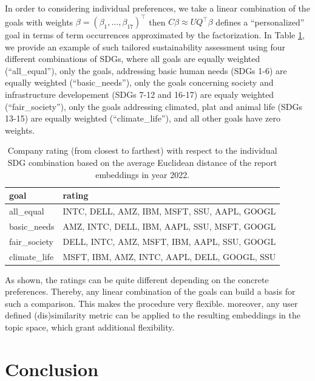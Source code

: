 \documentclass[
]{article}
\begin{document}
In order to considering individual preferences, we take a linear combination of the goals with weights \(\beta=(\beta_1,\ldots,\beta_{17})^\top\) then \(C\beta\approx UQ^\top\beta\) defines a ``personalized'' goal in terms of term occurrences approximated by the factorization. In Table \ref{tab:tab03}, we provide an example of such tailored sustainability assessment using four different combinations of SDGs, where all goals are equally weighted (``all\_equal''), only the goals, addressing basic human needs (SDGs 1-6) are equally weighted (``basic\_needs''), only the goals concerning society and infrastructure developement (SDGs 7-12 and 16-17) are equaly weighted (``fair\_society''), only the goals addressing climated, plat and animal life (SDGs 13-15) are equally weighted (``climate\_life''), and all other goals have zero weights.

\begin{table}

\caption{\label{tab:tab03}Company rating (from closest to farthest) with respect to the individual SDG combination based on the average Euclidean distance of the report embeddings in year 2022.}
\centering
\begin{tabular}[t]{l|l}
\hline
goal & rating\\
\hline
all\_equal & INTC, DELL, AMZ, IBM, MSFT, SSU, AAPL, GOOGL\\
\hline
basic\_needs & AMZ, INTC, DELL, IBM, AAPL, SSU, MSFT, GOOGL\\
\hline
fair\_society & DELL, INTC, AMZ, MSFT, IBM, AAPL, SSU, GOOGL\\
\hline
climate\_life & MSFT, IBM, AMZ, INTC, AAPL, DELL, GOOGL, SSU\\
\hline
\end{tabular}
\end{table}

As shown, the ratings can be quite different depending on the concrete preferences. Thereby, any linear combination of the goals can build a basis for such a comparison. This makes the procedure very flexible. moreover, any user defined (dis)similarity metric can be applied to the resulting embeddings in the topic space, which grant additional flexibility.

\hypertarget{conclusion}{%
\section{Conclusion}\label{conclusion}}
\end{document}

